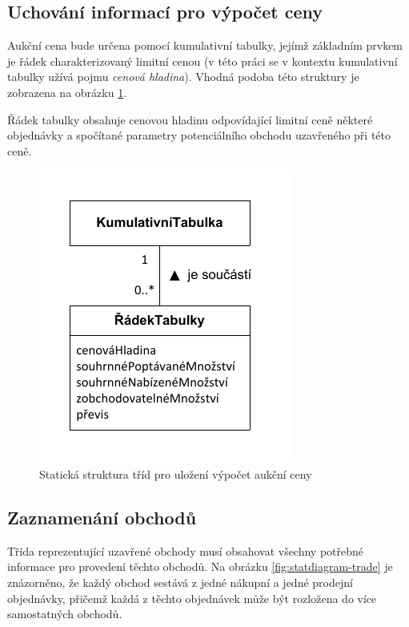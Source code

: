 \documentclass[thesis=M,czech]{FITthesis}[2012/06/26]
\begin{document}

\subsection{Uchování informací pro výpočet ceny}

Aukční cena bude určena pomocí kumulativní tabulky, jejímž základním prvkem je řádek charakterizovaný limitní cenou (v této práci se 
v kontextu kumulativní tabulky užívá pojmu \textit{cenová hladina}). Vhodná podoba této struktury je zobrazena na obrázku \ref{fig:statdiagram-pcr}.

Řádek tabulky obsahuje cenovou hladinu odpovídající limitní ceně některé objednávky a spočítané parametry potenciálního obchodu 
uzavřeného při této ceně.

\begin{figure}\centering
	\includegraphics[]{images/statdiagram-pcr} 
	\caption[Statická struktura tříd pro uložení výpočet aukční ceny]{Statická struktura tříd pro uložení výpočet aukční ceny}\label{fig:statdiagram-pcr}
\end{figure}


\subsection{Zaznamenání obchodů}

Třída reprezentující uzavřené obchody musí obsahovat všechny potřebné informace pro provedení těchto obchodů. Na obrázku 
\ref{fig:statdiagram-trade} je znázorněno, že každý obchod sestává z jedné nákupní a jedné prodejní objednávky, přičemž každá
z těchto objednávek může být rozložena do více samostatných obchodů.
\end{document}
